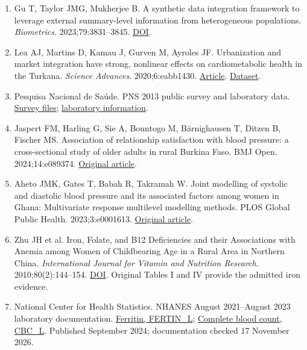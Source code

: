 \documentclass[11pt,letterpaper]{article}
\begin{document}
\begin{enumerate}[label=\arabic*.,leftmargin=2.1em,itemsep=.2em,parsep=0pt]
\item Gu T, Taylor JMG, Mukherjee B. A synthetic data integration framework to leverage external summary-level information from heterogeneous populations. \emph{Biometrics}. 2023;79:3831–\allowbreak{}3845. \href{https://doi.org/10.1111/biom.13852}{DOI}.

\item Lea AJ, Martins D, Kamau J, Gurven M, Ayroles JF. Urbanization and market integration have strong, nonlinear effects on cardiometabolic health in the Turkana. \emph{Science Advances}. 2020;6:eabb1430. \href{https://doi.org/10.1126/sciadv.abb1430}{Article}. \href{https://doi.org/10.5061/dryad.2z34tmpjk}{Dataset}.

\item Pesquisa Nacional de Saúde. PNS 2013 public survey and laboratory data. \href{https://www.pns.icict.fiocruz.br/bases-de-dados/}{Survey files}; \href{https://www.pns.icict.fiocruz.br/exames-laboratoriais/}{laboratory information}.

\item Jaspert FM, Harling G, Sie A, Bountogo M, Bärnighausen T, Ditzen B, Fischer MS. Association of relationship satisfaction with blood pressure: a cross-sectional study of older adults in rural Burkina Faso. BMJ Open. 2024;14:e089374. \href{https://doi.org/10.1136/bmjopen-2024-089374}{Original article}.

\item Aheto JMK, Gates T, Babah R, Takramah W. Joint modelling of systolic and diastolic blood pressure and its associated factors among women in Ghana: Multivariate response multilevel modelling methods. PLOS Global Public Health. 2023;3:e0001613. \href{https://pmc.ncbi.nlm.nih.gov/articles/PMC10132648/}{Original article}.

\item Zhu JH et al. Iron, Folate, and B12 Deficiencies and their Associations with Anemia among Women of Childbearing Age in a Rural Area in Northern China. \emph{International Journal for Vitamin and Nutrition Research}. 2010;80(2):144–\allowbreak{}154. \href{https://doi.org/10.1024/0300-9831/a000014}{DOI}. Original Tables I and IV provide the admitted iron evidence.

\item National Center for Health Statistics. NHANES August 2021–\allowbreak{}August 2023 laboratory documentation. \href{https://wwwn.cdc.gov/Nchs/Data/Nhanes/Public/2021/DataFiles/FERTIN\_L.htm}{Ferritin, FERTIN\_L}; \href{https://wwwn.cdc.gov/Nchs/Data/Nhanes/Public/2021/DataFiles/CBC\_L.htm}{Complete blood count, CBC\_L}. Published September 2024; documentation checked 17 November 2026.

\end{enumerate}
\end{document}
